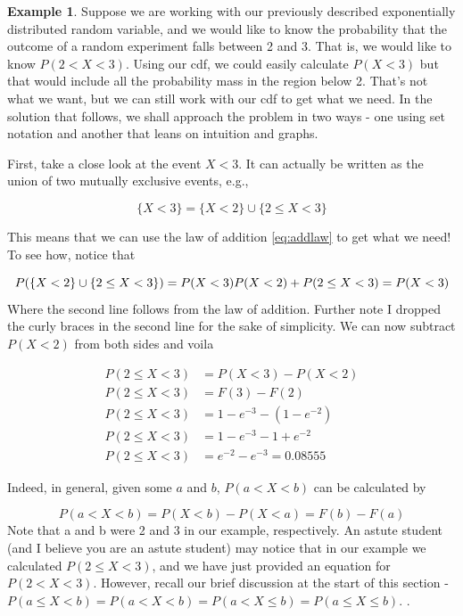 \documentclass[
]{book}
\theoremstyle{definition}
\theoremstyle{definition}
\newtheorem{example}{Example}[chapter]
\theoremstyle{definition}
\theoremstyle{definition}
\theoremstyle{remark}
\begin{document}
\begin{example}
\protect\hypertarget{exm:exp}{}\label{exm:exp}Suppose we are working with our previously described exponentially distributed random variable, and we would like to know the probability that the outcome of a random experiment falls between 2 and 3. That is, we would like to know \(P(2 < X < 3)\). Using our cdf, we could easily calculate \(P(X < 3)\) but that would include all the probability mass in the region below 2. That's not what we want, but we can still work with our cdf to get what we need. In the solution that follows, we shall approach the problem in two ways - one using set notation and another that leans on intuition and graphs.

First, take a close look at the event \(X < 3\). It can actually be written as the union of two mutually exclusive events, e.g.,

\[
\{X < 3\} = \{X < 2\} \cup \{2 \leq X < 3\}
\]

This means that we can use the law of addition \eqref{eq:addlaw} to get what we need! To see how, notice that

\[
P(\{X < 2\} \cup \{2 \leq X < 3\}) = P(X < 3) \\
P(X < 2) + P(2 \leq X < 3) = P(X < 3)
\]
Where the second line follows from the law of addition. Further note I dropped the curly braces in the second line for the sake of simplicity. We can now subtract \(P(X < 2)\) from both sides and voila

\begin{align}
P(2 \leq X < 3) &= P(X < 3) - P(X < 2) \\
P(2 \leq X < 3) &= F(3) - F(2) \\
P(2 \leq X < 3) &= 1-e^{-3} - (1 - e^{-2}) \\
P(2 \leq X < 3) &= 1-e^{-3} - 1 + e^{-2} \\
P(2 \leq X < 3) &= e^{-2}-e^{-3} = 0.08555
\end{align}

Indeed, in general, given some \(a\) and \(b\), \(P(a < X < b)\) can be calculated by

\[
P(a < X < b) = P(X < b) - P(X < a) = F(b) - F(a)
\label{eq:fundamental}
\]
Note that a and b were 2 and 3 in our example, respectively. An astute student (and I believe you are an astute student) may notice that in our example we calculated \(P(2 \leq X < 3)\), and we have just provided an equation for \(P(2 < X < 3)\). However, recall our brief discussion at the start of this section - \(P(a \leq X < b) = P(a < X < b) = P(a < X \leq b) = P(a \leq X \leq b)\). .


\end{example}
\end{document}
